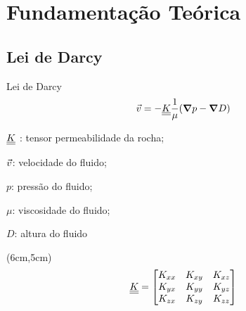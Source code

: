 \documentclass[professionalfont]{beamer}
\begin{document}

\section{Fundamentação Teórica}

\subsection{Lei de Darcy}


    
    


\begin{frame}{Lei de Darcy}
    \begin{equation}
        \vec{v} = -\underline{\underline{K}} \dfrac{1}{\mu} (\mbox{\boldmath$ \nabla $} p - \mbox{\boldmath$ \nabla $} D)
    \end{equation}
    
    \vspace{0.3cm}
    
    \begin{description}[]
        \item $\underline{\underline{K}}$ : tensor permeabilidade da rocha;
        \item $\vec{v}$: velocidade do fluido;
        \item $p$: pressão do fluido;
        \item $\mu$: viscosidade do fluido;
        \item $D$: altura do fluido
    \end{description}
    
    \begin{textblock*}{.5\paperwidth}(6cm,5cm)
        \begin{align*}
            \underline{\underline{K}} = 
            \begin{bmatrix}
            	K_{xx} & K_{xy} & K_{xz} \\
            	K_{yx} & K_{yy} & K_{yz} \\
            	K_{zx} & K_{zy} & K_{zz}
	        \end{bmatrix}
        \end{align*}
    \end{textblock*}
    
\end{frame}
\end{document}
